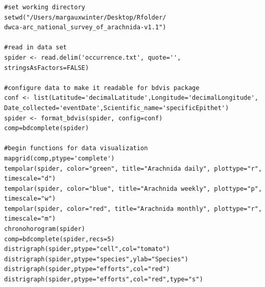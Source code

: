 \begin{lstlisting}[morekeywords={delim,Latitude,Longitude,config,Date_collected,Scientific_name,bdvis,bdcomplete,chronohorogram,distrigraph,bdcalendarheat,stringsAsFactors,ptype,timescale,recs,ylab,type,color,Scientific,name,Date,collected,tempolar,mapgrid}]
#set working directory
setwd("/Users/margauxwinter/Desktop/Rfolder/
dwca-arc_national_survey_of_arachnida-v1.1")

#read in data set
spider <- read.delim('occurrence.txt', quote='', stringsAsFactors=FALSE)

#configure data to make it readable for bdvis package
conf <- list(Latitude='decimalLatitude',Longitude='decimalLongitude',
Date_collected='eventDate',Scientific_name='specificEpithet')
spider <- format_bdvis(spider, config=conf)
comp=bdcomplete(spider)

#begin functions for data visualization
mapgrid(comp,ptype='complete')
tempolar(spider, color="green", title="Arachnida daily", plottype="r", timescale="d") 
tempolar(spider, color="blue", title="Arachnida weekly", plottype="p", timescale="w") 
tempolar(spider, color="red", title="Arachnida monthly", plottype="r", timescale="m") 
chronohorogram(spider) 
comp=bdcomplete(spider,recs=5)
distrigraph(spider,ptype="cell",col="tomato") 
distrigraph(spider,ptype="species",ylab="Species") 
distrigraph(spider,ptype="efforts",col="red") 
distrigraph(spider,ptype="efforts",col="red",type="s") 
\end{lstlisting}
